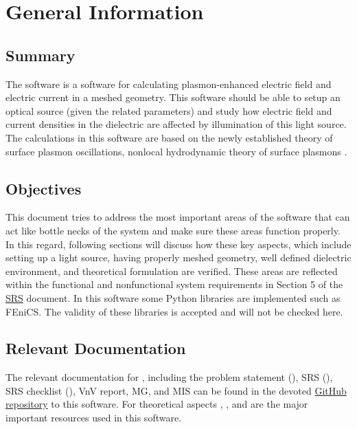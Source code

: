 \documentclass[12pt, titlepage]{article}
\begin{document}
\section{General Information}

\subsection{Summary}

The \progname{} software is a software for calculating plasmon-enhanced electric field and electric current in a meshed geometry. This software should be able to setup an optical source (given the related parameters) and study how electric field and current densities in the dielectric are affected by illumination of this light source. The calculations in this software are based on the newly established theory of surface plasmon oscillations, nonlocal hydrodynamic theory of surface plasmons \citep{hiremath2012numerical}.   

\subsection{Objectives}
\label{obj}

This document tries to address the most important areas of the \progname{} software that can act like bottle necks of the system and make sure these areas function properly. In this regard, following sections will discuss how these key aspects, which include setting up a light source, having properly meshed geometry, well defined dielectric environment, and theoretical formulation are verified. These areas are reflected within the functional and nonfunctional system requirements in Section 5 of the \href{https://github.com/shmouses/SPDFM/tree/master/docs/SRS}{SRS} document.  
In this software some Python libraries are implemented such as FEniCS. The validity of these libraries is accepted and will not be checked here. 

\subsection{Relevant Documentation}

The relevant documentation for \progname{}, including the problem statement (\cite{SPDFMdoc22:online}), SRS (\cite{SPDFMdoc90:online}), SRS checklist (\cite{BlankPro77:online}), VnV report, MG, and MIS can be found in the devoted \href{https://github.com/shmouses/SPDFM}{GitHub repository} to this software. For theoretical aspects \cite{hiremath2012numerical}, \cite{monk2003finite}, and \cite{maier2007plasmonics} are the major important resources used in this software.  
\end{document}
